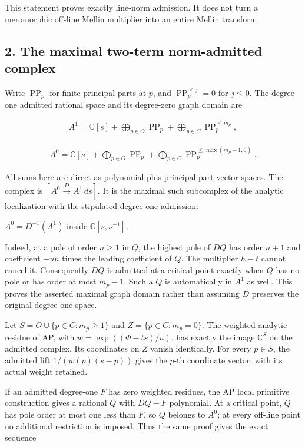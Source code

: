 This statement proves exactly line-norm admission. It does not turn a
meromorphic off-line Mellin multiplier into an entire Mellin transform.


\subsection*{2. The maximal two-term norm-admitted complex}


Write \(\operatorname{PP}_p\) for finite principal parts at \(p\), and \(\operatorname{PP}_p^{\le j}=0\) for
\(j\le0\). The degree-one admitted rational space and its degree-zero graph
domain are


\[
\begin{gathered}
A^1=\mathbb C[s]+\bigoplus_{p\in O}\operatorname{PP}_p+\bigoplus_{p\in C}\operatorname{PP}_p^{\le m_p},
\end{gathered}
\]


\[
\begin{gathered}
A^0=\mathbb C[s]+\bigoplus_{p\in O}\operatorname{PP}_p+\bigoplus_{p\in C}\operatorname{PP}_p^{\le\max(m_p-1,0)}.
\end{gathered}
\]


All sums here are direct as polynomial-plus-principal-part vector spaces.
The complex is \([A^0\xrightarrow{D}A^1\,ds]\). It is the maximal such subcomplex
of the analytic localization with the stipulated degree-one admission:


\(A^0=D^{-1}(A^1)\) inside \(\mathbb C[s,\nu^{-1}]\).


Indeed, at a pole of order \(n\ge1\) in \(Q\), the highest pole of \(DQ\) has order
\(n+1\) and coefficient \(-un\) times the leading coefficient of \(Q\). The
multiplier \(h-t\) cannot cancel it. Consequently \(DQ\) is admitted at a critical
point exactly when \(Q\) has no pole or has order at most \(m_p-1\). Such a \(Q\)
is automatically in \(A^1\) as well. This proves the asserted maximal graph
domain rather than assuming \(D\) preserves the original degree-one space.


Let \(S=O\cup\{p\in C:m_p\ge1\}\) and \(Z=\{p\in C:m_p=0\}\). The weighted
analytic residue of AP, with \(w=\exp((\Phi-ts)/u)\), has exactly the image
\(\mathbb C^S\) on the admitted complex. Its coordinates on \(Z\) vanish identically.
For every \(p\in S\), the admitted lift \(1/(w(p)(s-p))\) gives the \(p\)-th
coordinate vector, with its actual weight retained.


If an admitted degree-one \(F\) has zero weighted residues, the AP local
primitive construction gives a rational \(Q\) with \(DQ-F\) polynomial. At a
critical point, \(Q\) has pole order at most one less than \(F\), so \(Q\) belongs
to \(A^0\); at every off-line point no additional restriction is imposed.
Thus the same proof gives the exact sequence


